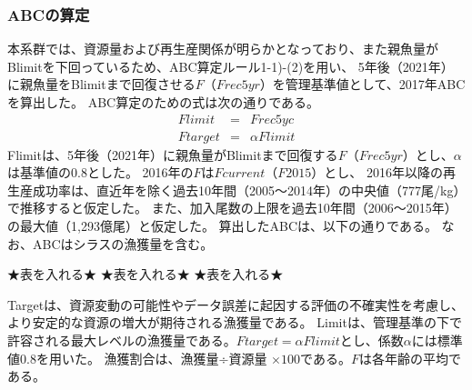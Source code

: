 \subsubsection{ABCの算定}
本系群では、資源量および再生産関係が明らかとなっており、また親魚量がBlimitを下回っているため、ABC算定ルール1-1)-(2)を用い、
5年後（2021年）に親魚量をBlimitまで回復させる$F$（$Frec5yr$）を管理基準値として、2017年ABCを算出した。
ABC算定のための式は次の通りである。
\begin{eqnarray*}
Flimit &=& Frec5yc\\
Ftarget &=& \alpha Flimit
\end{eqnarray*}
Flimitは、5年後（2021年）に親魚量がBlimitまで回復する$F$（$Frec5yr$）とし、$\alpha$は基準値の0.8とした。
2016年の$F$は$Fcurrent$（$F2015$）とし、
2016年以降の再生産成功率は、直近年を除く過去10年間（2005～2014年）の中央値（777尾/kg）で推移すると仮定した。
また、加入尾数の上限を過去10年間（2006～2015年）の最大値（1,293億尾）と仮定した。
算出したABCは、以下の通りである。
なお、ABCはシラスの漁獲量を含む。

★表を入れる★
★表を入れる★
★表を入れる★

Targetは、資源変動の可能性やデータ誤差に起因する評価の不確実性を考慮し、より安定的な資源の増大が期待される漁獲量である。
Limitは、管理基準の下で許容される最大レベルの漁獲量である。$Ftarget = \alpha Flimit$とし、係数$\alpha$には標準値0.8を用いた。
漁獲割合は、漁獲量÷資源量 $\times100$である。$F$は各年齢の平均である。
